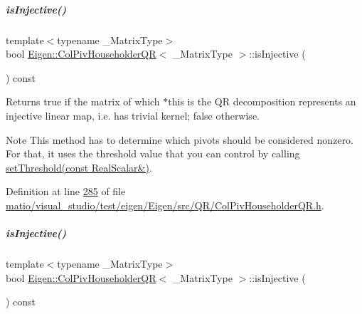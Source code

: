 \mbox{\label{group___q_r___module_a0031998053c9c7345c9458f7443aa263}} 
\subparagraph{\texorpdfstring{is\+Injective()}{isInjective()}\hspace{0.1cm}{\footnotesize\ttfamily [1/2]}}
{\footnotesize\ttfamily template$<$typename \+\_\+\+Matrix\+Type$>$ \\
bool \hyperlink{group___q_r___module_class_eigen_1_1_col_piv_householder_q_r}{Eigen\+::\+Col\+Piv\+Householder\+QR}$<$ \+\_\+\+Matrix\+Type $>$\+::is\+Injective (\begin{DoxyParamCaption}{ }\end{DoxyParamCaption}) const\hspace{0.3cm}{\ttfamily [inline]}}

\begin{DoxyReturn}{Returns}
true if the matrix of which $\ast$this is the QR decomposition represents an injective linear map, i.\+e. has trivial kernel; false otherwise.
\end{DoxyReturn}
\begin{DoxyNote}{Note}
This method has to determine which pivots should be considered nonzero. For that, it uses the threshold value that you can control by calling \hyperlink{group___q_r___module_ae712cdc9f0e521cfc8061bee58ff55ee}{set\+Threshold(const Real\+Scalar\&)}. 
\end{DoxyNote}


Definition at line \hyperlink{matio_2visual__studio_2test_2eigen_2_eigen_2src_2_q_r_2_col_piv_householder_q_r_8h_source_l00285}{285} of file \hyperlink{matio_2visual__studio_2test_2eigen_2_eigen_2src_2_q_r_2_col_piv_householder_q_r_8h_source}{matio/visual\+\_\+studio/test/eigen/\+Eigen/src/\+Q\+R/\+Col\+Piv\+Householder\+Q\+R.\+h}.

\mbox{\label{group___q_r___module_a0031998053c9c7345c9458f7443aa263}} 
\subparagraph{\texorpdfstring{is\+Injective()}{isInjective()}\hspace{0.1cm}{\footnotesize\ttfamily [2/2]}}
{\footnotesize\ttfamily template$<$typename \+\_\+\+Matrix\+Type$>$ \\
bool \hyperlink{group___q_r___module_class_eigen_1_1_col_piv_householder_q_r}{Eigen\+::\+Col\+Piv\+Householder\+QR}$<$ \+\_\+\+Matrix\+Type $>$\+::is\+Injective (\begin{DoxyParamCaption}{ }\end{DoxyParamCaption}) const\hspace{0.3cm}{\ttfamily [inline]}}

